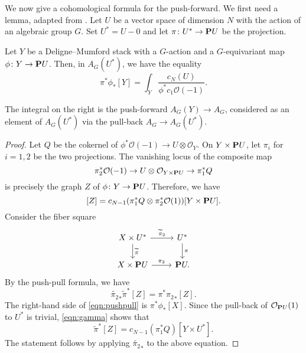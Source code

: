 \documentclass{amsart}
\renewcommand{\O}{\mathcal O}
\begin{document}
We now give a cohomological formula for the push-forward.
We first need a lemma, adapted from \cite[Proposition~2.1]{deo.pat:22}.
Let \(U\) be a vector space of dimension \(N\) with the action of an algebraic group \(G\).
Set \(U^{*} = U-0\) and let \(\pi \colon U^{*} \to \P U\) be the projection.
\begin{lemma}\label{prop:pushforward}
  Let \(Y\) be a Deligne--Mumford stack with a \(G\)-action and a \(G\)-equivariant map \(\phi \colon Y \to \P U\).
  Then, in \(A_G(U^{*})\), we have the equality
  \[ \pi^{*} \phi_{*}[Y] =  \int_{Y} \frac{c_{N}(U)}{\phi^* c_1 \O(-1)}.\]
\end{lemma}
  The integral on the right is the push-forward \(A_G(Y) \to A_G\),  considered as an element of \(A_G(U^{*})\) via the pull-back \(A_G \to A_G(U^{*})\).
\begin{proof}
  Let \(Q\) be the cokernel of \(\phi^{*}\O(-1) \to U \otimes \O_Y\).
  On \(Y \times \P U\), let \(\pi_{i}\) for \(i = 1,2\) be the two projections.
  The vanishing locus of the composite map
  \[ \pi_2^{*} \O(-1) \to U \otimes \O_{Y \times \P U} \to \pi_1^{*} Q\]
  is precisely the graph \(Z\) of \(\phi \colon Y \to \P U\).
  Therefore, we have
  \begin{equation}\label{eqn:gamma}
    [Z] = c_{N-1}(\pi_1^{*}Q \otimes \pi_2^{*}\O(1)) [Y \times \P U].
  \end{equation}
 Consider the fiber square
  \[
    \begin{tikzcd}
      X \times U^{*} \ar{r}{\widetilde\pi_2}\ar{d}{\widetilde\pi}& U^{*}\ar{d}{\pi} \\
      X \times \P U \ar{r}{\pi_2} & \P U.
    \end{tikzcd}
  \]
  By the push-pull formula, we have
  \begin{equation}\label{eqn:pushpull}
    {\widetilde{\pi_2}}_{*}\widetilde\pi^{*} [Z] = \pi^{*} {\pi_2}_{*}[Z].
  \end{equation}
  The right-hand side of \eqref{eqn:pushpull} is \(\pi^{*}\phi_{*}[X]\).
  Since the pull-back of \(\O_{\P U}(1)\) to \(U^{*}\) is trivial, \eqref{eqn:gamma} shows that 
  \[\widetilde\pi^{*}[Z] = c_{N-1}(\pi_1^{*}Q)[Y \times U^{*}].\]
  The statement follows by applying \({\widetilde{\pi_2}}_{*}\) to the above equation.
\end{proof}
\end{document}
